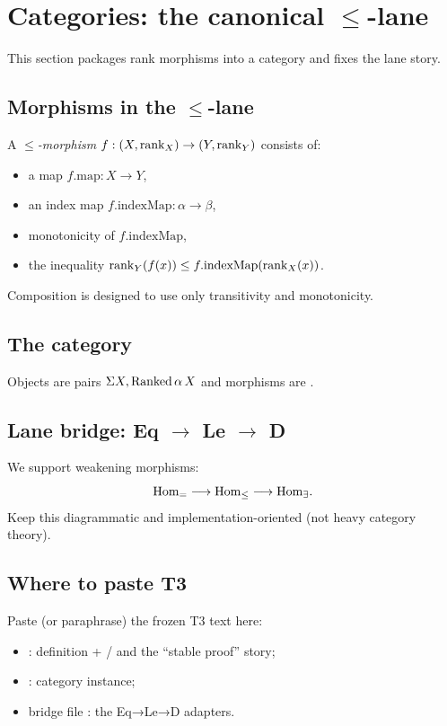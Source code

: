 \section{Categories: the canonical \texorpdfstring{$\le$}{Le}-lane}
\label{sec:rankcat}

This section packages rank morphisms into a category and fixes the lane story.

\subsection{Morphisms in the \texorpdfstring{$\le$}{Le}-lane}
\begin{definition}
A \emph{\(\le\)-morphism} \(f : (X,\mathrm{rank}_X)\to (Y,\mathrm{rank}_Y)\) consists of:
\begin{itemize}
\item a map \(f.\mathrm{map}:X\to Y\),
\item an index map \(f.\mathrm{indexMap}:\alpha\to\beta\),
\item monotonicity of \(f.\mathrm{indexMap}\),
\item the inequality \(\mathrm{rank}_Y(f(x)) \le f.\mathrm{indexMap}(\mathrm{rank}_X(x))\).
\end{itemize}
Composition is designed to use only transitivity and monotonicity.
\end{definition}

\subsection{The category }
\begin{definition}
Objects are pairs \(\Sigma X, \mathrm{Ranked}\,\alpha\,X\) and morphisms are .
\end{definition}

\subsection{Lane bridge: Eq \texorpdfstring{$\to$}{->} Le \texorpdfstring{$\to$}{->} D}
We support weakening morphisms:
\[
  \mathrm{Hom}_{=} \longrightarrow \mathrm{Hom}_{\le} \longrightarrow \mathrm{Hom}_{\exists}.
\]
Keep this diagrammatic and implementation-oriented (not heavy category theory).

\subsection{Where to paste T3}
Paste (or paraphrase) the frozen T3 text here:
\begin{itemize}
\item {}: definition + / and the “stable proof” story;
\item {}: category instance;
\item bridge file : the Eq→Le→D adapters.
\end{itemize}
